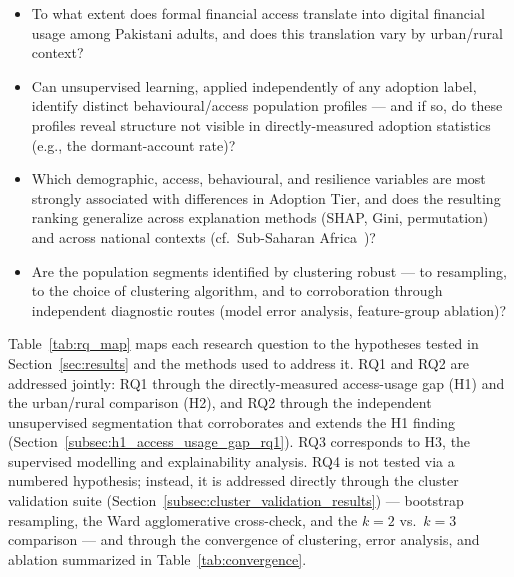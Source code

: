\documentclass[conference]{IEEEtran}
\begin{document}
\begin{itemize}
\item[\textbf{RQ1.}] To what extent does formal financial access translate
into digital financial usage among Pakistani adults, and does this
translation vary by urban/rural context?
\item[\textbf{RQ2.}] Can unsupervised learning, applied independently of
any adoption label, identify distinct behavioural/access population
profiles --- and if so, do these profiles reveal structure not visible in
directly-measured adoption statistics (e.g., the dormant-account rate)?
\item[\textbf{RQ3.}] Which demographic, access, behavioural, and
resilience variables are most strongly associated with differences in
Adoption Tier, and does the resulting ranking generalize across
explanation methods (SHAP, Gini, permutation) and across national
contexts (cf.\ Sub-Saharan Africa~\cite{saidy2025})?
\item[\textbf{RQ4.}] Are the population segments identified by clustering
robust --- to resampling, to the choice of clustering algorithm, and to
corroboration through independent diagnostic routes (model error
analysis, feature-group ablation)?
\end{itemize}

Table~\ref{tab:rq_map} maps each research question to the hypotheses
tested in Section~\ref{sec:results} and the methods used to address it. RQ1 and RQ2 are
addressed jointly: RQ1 through the directly-measured access-usage gap
(H1) and the urban/rural comparison (H2), and RQ2 through the independent
unsupervised segmentation that corroborates and extends the H1 finding
(Section~\ref{subsec:h1_access_usage_gap_rq1}). RQ3 corresponds to H3, the supervised modelling and
explainability analysis. RQ4 is not tested via a numbered hypothesis;
instead, it is addressed directly through the cluster validation suite
(Section~\ref{subsec:cluster_validation_results}) --- bootstrap resampling, the Ward agglomerative
cross-check, and the $k=2$ vs.\ $k=3$ comparison --- and through the
convergence of clustering, error analysis, and ablation summarized in
Table~\ref{tab:convergence}.
\end{document}
